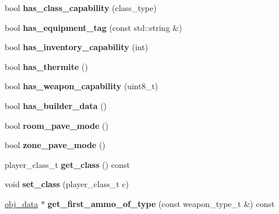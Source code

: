\begin{DoxyCompactItemize}
bool {\bfseries has\+\_\+class\+\_\+capability} (class\+\_\+type)
\item 
\mbox{\label{classmods_1_1player_a9685c8a6c64a4ebc5020d7acdc5998ca}} 
bool {\bfseries has\+\_\+equipment\+\_\+tag} (const std\+::string \&)
\item 
\mbox{\label{classmods_1_1player_a388ff716cb50f09aac0748bb96a42b6d}} 
bool {\bfseries has\+\_\+inventory\+\_\+capability} (int)
\item 
\mbox{\label{classmods_1_1player_a7aa761f41a093581ba531b2aca325609}} 
bool {\bfseries has\+\_\+thermite} ()
\item 
\mbox{\label{classmods_1_1player_a3b7e1b89793257636a2b34905bf1ec87}} 
bool {\bfseries has\+\_\+weapon\+\_\+capability} (uint8\+\_\+t)
\item 
\mbox{\label{classmods_1_1player_a820086915f10495e365413a391f331d4}} 
bool {\bfseries has\+\_\+builder\+\_\+data} ()
\item 
\mbox{\label{classmods_1_1player_ac44c2d6cab0cfd2bcce014339b2972a6}} 
bool {\bfseries room\+\_\+pave\+\_\+mode} ()
\item 
\mbox{\label{classmods_1_1player_ada7986bb6604aeacaac9d1f22e32c66e}} 
bool {\bfseries zone\+\_\+pave\+\_\+mode} ()
\item 
\mbox{\label{classmods_1_1player_a048c0e70991f8a290cfda61d754b46f8}} 
player\+\_\+class\+\_\+t {\bfseries get\+\_\+class} () const
\item 
\mbox{\label{classmods_1_1player_a16948903572ee0b751746ea39e4a219e}} 
void {\bfseries set\+\_\+class} (player\+\_\+class\+\_\+t c)
\item 
\mbox{\label{classmods_1_1player_a3ee5b9cc2ec5bfcd3c4768831653c2c3}} 
\hyperlink{structobj__data}{obj\+\_\+data} $\ast$ {\bfseries get\+\_\+first\+\_\+ammo\+\_\+of\+\_\+type} (const weapon\+\_\+type\+\_\+t \&) const
\item 
\mbox{\label{classmods_1_1player_af03346ba20be5abc4371d38c65934172}} 

\end{DoxyCompactItemize}
